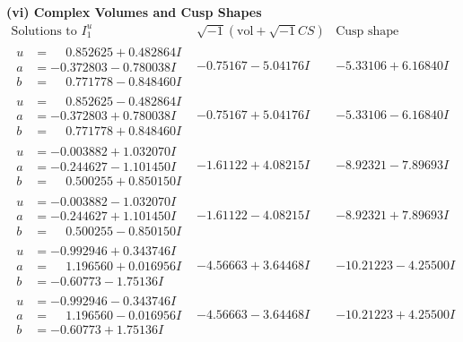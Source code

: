 \documentclass[1p]{elsarticle_modified}
\theoremstyle{definition}
\newcommand{\I}{\sqrt{-1}}
\begin{document}
\newpage\flushleft \textbf{(vi) Complex Volumes and Cusp Shapes}
$$\begin{array}{c|c|c}  
\text{Solutions to }I^u_{1}& \I (\text{vol} + \sqrt{-1}CS) & \text{Cusp shape}\\
 \hline 
\begin{aligned}
u &= \phantom{-}0.852625 + 0.482864 I \\
a &= -0.372803 - 0.780038 I \\
b &= \phantom{-}0.771778 - 0.848460 I\end{aligned}
 & -0.75167 - 5.04176 I & -5.33106 + 6.16840 I \\ \hline\begin{aligned}
u &= \phantom{-}0.852625 - 0.482864 I \\
a &= -0.372803 + 0.780038 I \\
b &= \phantom{-}0.771778 + 0.848460 I\end{aligned}
 & -0.75167 + 5.04176 I & -5.33106 - 6.16840 I \\ \hline\begin{aligned}
u &= -0.003882 + 1.032070 I \\
a &= -0.244627 - 1.101450 I \\
b &= \phantom{-}0.500255 + 0.850150 I\end{aligned}
 & -1.61122 + 4.08215 I & -8.92321 - 7.89693 I \\ \hline\begin{aligned}
u &= -0.003882 - 1.032070 I \\
a &= -0.244627 + 1.101450 I \\
b &= \phantom{-}0.500255 - 0.850150 I\end{aligned}
 & -1.61122 - 4.08215 I & -8.92321 + 7.89693 I \\ \hline\begin{aligned}
u &= -0.992946 + 0.343746 I \\
a &= \phantom{-}1.196560 + 0.016956 I \\
b &= -0.60773 - 1.75136 I\end{aligned}
 & -4.56663 + 3.64468 I & -10.21223 - 4.25500 I \\ \hline\begin{aligned}
u &= -0.992946 - 0.343746 I \\
a &= \phantom{-}1.196560 - 0.016956 I \\
b &= -0.60773 + 1.75136 I\end{aligned}
 & -4.56663 - 3.64468 I & -10.21223 + 4.25500 I \\ \hline\begin{aligned}

\end{aligned}
\end{array}$$
\end{document}
